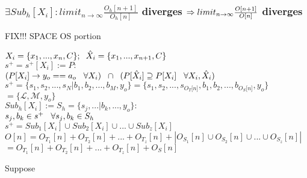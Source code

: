 \documentclass[11pt]{article}
\begin{document}
\subsubsection{$\exists Sub_h[X_i]: limit_{n \rightarrow \infty} \frac{O_h[n+1]}{O_h[n]}$ diverges $\Rightarrow\\ limit_{n \rightarrow \infty} \frac{O[n+1]}{O[n]}$  diverges}
FIX!!! SPACE OS portion
\vspace{1mm}
\begin{center}
$
X_i = \{x_1,...,x_n,C\}; \hspace{2mm} \hat{X}_i = \{x_1,...,x_{n+1},C\}
$
\\ \vspace{2mm}
$
s^+ = s^+[X_i] := P :
$
\\ \vspace{2mm}
$
(P \lbrack X_i \rbrack \rightarrow y_{o} == a_{o} \hspace{3mm} \forall X_i) \hspace{2mm} \cap \hspace{2mm} (P[\hat{X}_i] \supseteq P[X_i] \hspace{3mm} \forall X_i,\hat{X}_i)
$
\\ \vspace{4mm}
$
s^+ = \{ s_1,s_2,...,s_N|b_1,b_2,...,b_M,y_o\} = \{ s_1,s_2,...,s_{O_T \lbrack n \rbrack }, b_1, b_2,...,b_{O_S \lbrack n \rbrack},y_o \}
$
\\ \vspace{2mm}
$
= \{ \mathcal{L},\mathcal{M},y_o\}
$
\\ \vspace{6mm}
$
Sub_h[X_i] := S_h = \{s_j,...|b_k,...,y_o\}:
$
\\ \vspace{2mm}
$
s_j, b_k \in s^+ \hspace{3mm} \forall s_j,b_k \in S_h
$
\\ \vspace{6mm}
$
s^+ = Sub_1[X_i] \cup Sub_2[X_i] \cup ... \cup Sub_z[X_i]
$
\\ \vspace{2mm}
$
O[n] = O_{T_1}[n] + O_{T_2}[n] + ... + O_{T_z}[n] + |O_{S_1}[n] \cup O_{S_2}[n] \cup  ... \cup O_{S_z}[n]|
$
\\ \vspace{2mm}
$
= O_{T_1}[n] + O_{T_2}[n] + ... + O_{T_z}[n] + O_S[n]
$
\end{center}
\vspace{8mm}
Suppose 
\end{document}
